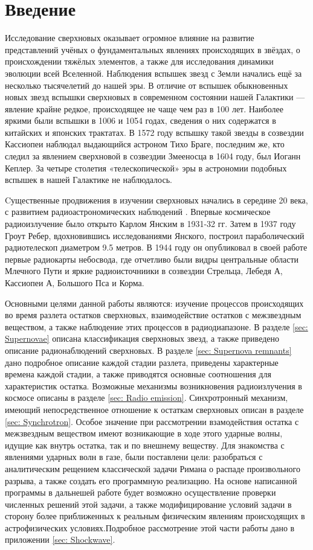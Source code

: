 \documentclass[a4paper,12pt]{extarticle}
\begin{document}
\section{Введение}
Исследование сверхновых оказывает огромное влияние на развитие представлений учёных о фундаментальных явлениях происходящих в звёздах, о происхождении тяжёлых элементов, а также для исследования динамики эволюции всей Вселенной. 
Наблюдения вспышек звезд с Земли начались ещё за несколько тысячелетий до нашей эры.
В отличие от вспышек обыкновенных новых звезд вспышки сверхновых в современном состоянии нашей Галактики — явление крайне редкое, происходящее не чаще чем раз в 100 лет. Наиболее яркими были вспышки в 1006 и 1054 годах, сведения о них содержатся в китайских и японских трактатах. В 1572 году вспышку такой звезды в созвездии Кассиопеи наблюдал выдающийся астроном Тихо Браге, последним же, кто следил за явлением сверхновой в созвездии Змееносца в 1604 году, был Иоганн Кеплер. За четыре столетия «телескопической» эры в астрономии подобных вспышек в нашей Галактике не наблюдалось.

Cущественные продвижения в изучении сверхновых начались в середине 20 века, с развитием радиоастрономических наблюдений \cite{Kaplan1966}.  
Впервые космическое радиоизлучение было открыто Карлом Янским в 1931-32 гг. Затем в 1937 году Гроут Ребер, вдохновившись исследованиями Янского, построил параболический радиотелескоп диаметром 9.5 метров. В 1944 году он опубликовал в своей работе первые радиокарты небосвода, где отчетливо были видры центральные области Млечного Пути и яркие радиоисточниики в созвездии Стрельца, Лебедя А, Кассиопеи А, Большого Пса и Корма. 

Основными целями данной работы являются: изучение процессов происходящих во время разлета остатков сверхновых, взаимодействие остатков с межзвездным веществом, а также наблюдение этих процессов в радиодиапазоне. В разделе \ref{sec: Supernovae} описана классификация сверхновых звезд, а также приведено описание радионаблюдений сверхновых. В разделе \ref{sec: Supernova remnants} дано подробное описание каждой стадии разлета, приведены характерные времена каждой стадии, а также приводятся основные соотношения для характеристик остатка. Возможные механизмы возникновения радиоизлучения в космосе описаны в разделе \ref{sec: Radio emission}. Синхротронный механизм, имеющий непосредственное отношение к остаткам сверхновых описан в разделе \ref{sec: Synchrotron}.
Особое значение при рассмотрении взамодействия остатка с межзвездным веществом имеют возникающие в ходе этого ударные волны, идущие как внутрь остатка, так и по внешнему веществу. 
Для знакомства с явлениями ударных волн в газе, были поставлени цели: разобраться с аналитическим рещением классической задачи Римана о распаде произвольного разрыва, а также создать его программную реализацию. На основе написанной программы в дальнешей работе будет возможно осуществление проверки численных решений этой задачи, а также модифицирование условий задачи в сторону более приближенных к реальным физическим явлениям происходящих в астрофизических условиях.Подробное рассмотрение этой части работы дано в приложении \ref{sec: Shockwave}. 
\end{document}
